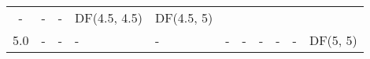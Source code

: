 \documentclass{article}
\begin{document}
\begin{longtable}[c]{@{}cllllllllll@{}}
\begin{minipage}[t]{0.13\columnwidth}
-
\strut\end{minipage} &
\begin{minipage}[t]{0.15\columnwidth}\raggedright\strut
-
\strut\end{minipage} &
\begin{minipage}[t]{0.13\columnwidth}\raggedright\strut
-
\strut\end{minipage} &
\begin{minipage}[t]{0.15\columnwidth}\raggedright\strut
DF(4.5, 4.5)
\strut\end{minipage} &
\begin{minipage}[t]{0.13\columnwidth}\raggedright\strut
DF(4.5, 5)
\strut\end{minipage}\tabularnewline
\begin{minipage}[t]{0.08\columnwidth}\centering\strut
5.0
\strut\end{minipage} &
\begin{minipage}[t]{0.15\columnwidth}\raggedright\strut
-
\strut\end{minipage} &
\begin{minipage}[t]{0.13\columnwidth}\raggedright\strut
-
\strut\end{minipage} &
\begin{minipage}[t]{0.15\columnwidth}\raggedright\strut
-
\strut\end{minipage} &
\begin{minipage}[t]{0.13\columnwidth}\raggedright\strut
-
\strut\end{minipage} &
\begin{minipage}[t]{0.15\columnwidth}\raggedright\strut
-
\strut\end{minipage} &
\begin{minipage}[t]{0.13\columnwidth}\raggedright\strut
-
\strut\end{minipage} &
\begin{minipage}[t]{0.15\columnwidth}\raggedright\strut
-
\strut\end{minipage} &
\begin{minipage}[t]{0.13\columnwidth}\raggedright\strut
-
\strut\end{minipage} &
\begin{minipage}[t]{0.15\columnwidth}\raggedright\strut
-
\strut\end{minipage} &
\begin{minipage}[t]{0.13\columnwidth}\raggedright\strut
DF(5, 5)
\strut\end{minipage}\tabularnewline
\bottomrule
\end{longtable}
\end{document}
